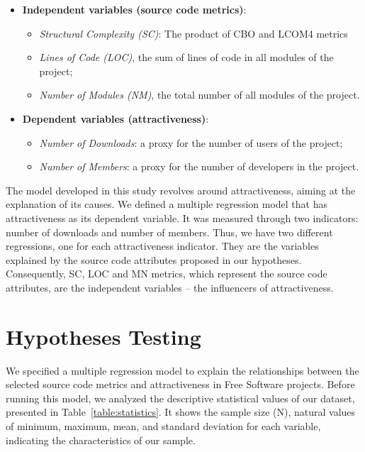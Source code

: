 \documentclass[conference]{IEEEtran}
\newcommand{\TODO}[1]{{\color{red}\textbf{\uwave{#1}}}}
\begin{document}
\begin{itemize}
\item \textbf{Independent variables (source code metrics)}:
%
\begin{itemize}
\item \emph{Structural Complexity (SC)}: The product of CBO and LCOM4 metrics
%
\item \emph{Lines of Code (LOC)}, the sum of lines of code in all modules of the
project;
%
\item \emph{Number of Modules (NM)}, the total number of all modules of the project.
\end{itemize}

\item \textbf{Dependent variables (attractiveness)}:
\begin{itemize}
\item \emph{Number of Downloads}: a proxy for the number of users of the
project;
%
\item \emph{Number of Members}: a proxy for the number of developers in the
project.
\end{itemize}
\end{itemize}

The model developed in this study revolves around attractiveness,
aiming at the explanation of its causes.
%
We defined a multiple regression model that has attractiveness as its dependent
variable. 
It was measured through two indicators: number of downloads and number of members. 
Thus, we have two different regressions, one for each attractiveness indicator.
%
They are the variables explained by the source code attributes proposed in our hypotheses.
%
Consequently, SC, LOC and MN metrics, which represent the source code attributes,
are the independent variables -- the influencers of attractiveness.

\section{Hypotheses Testing}   
\label{hypothesesTesting}


We specified a multiple regression model to explain the relationships 
between the selected source code metrics and attractiveness in Free Software projects.
%
Before running this model, we analyzed the descriptive statistical values
of our dataset, presented in Table~\ref{table:statistics}.
%
It shows the sample size (N), natural values of minimum, maximum, mean,
and standard deviation for each variable, indicating the characteristics of our sample.
\end{document}
